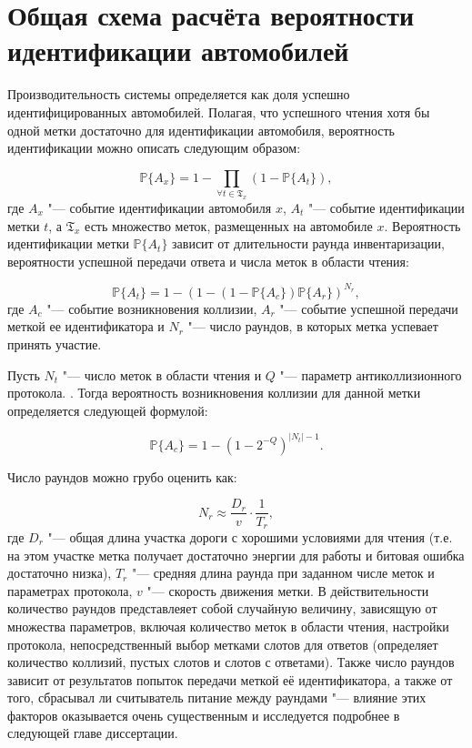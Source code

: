 \section{Общая схема расчёта вероятности идентификации автомобилей}\label{sec:ch2_general_scheme}
Производительность системы определяется как доля успешно идентифицированных автомобилей. Полагая, что успешного чтения хотя бы одной метки достаточно для идентификации автомобиля, вероятность идентификации можно описать следующим образом:

$$
	\mathbb{P}\{A_x\} = 1 - \prod\limits_{\forall t \in  \mathfrak{T}_x} (1 - \mathbb{P}\{A_t\}),
$$
где $A_x$ "--- событие идентификации автомобиля $x$, $A_t$ "--- событие идентификации метки $t$, а $\mathfrak{T}_x$ есть множество меток, размещенных на автомобиле $x$. Вероятность идентификации метки $\mathbb{P}\{A_t\}$ зависит от длительности раунда инвентаризации, вероятности успешной передачи ответа и числа меток в области чтения:

$$
	\mathbb{P}\{A_t\} = 1 - (1 - (1 - \mathbb{P}\{A_c\})\mathbb{P}\{A_r\})^{N_r},
$$
где $A_c$ "--- событие возникновения коллизии, $A_r$ "--- событие успешной передачи меткой ее идентификатора и $N_r$ "--- число раундов, в которых метка успевает принять участие. 

Пусть $N_t$ "--- число меток в области чтения и $Q$ "--- параметр антиколлизионного протокола. \cite{StdGen2}. Тогда вероятность возникновения коллизии для данной метки определяется следующей формулой: 

$$
	\mathbb{P}\{A_c\} = 1 - (1 - 2^{-Q})^{|N_t| - 1}.
$$

Число раундов можно грубо оценить как:

$$
	N_r \approx \frac{D_r}{v}\cdot\frac{1}{T_r},
$$
где $D_r$ "--- общая длина участка дороги с хорошими условиями для чтения (т.е. на этом участке метка получает достаточно энергии для работы и битовая ошибка достаточно низка), $T_r$ "--- средняя длина раунда при заданном числе меток и параметрах протокола, $v$ "--- скорость движения метки. В действительности количество раундов представлеяет собой случайную величину, зависящую от множества параметров, включая количество меток в области чтения, настройки протокола, непосредственный выбор метками слотов для ответов (определяет количество коллизий, пустых слотов и слотов с ответами). Также число раундов зависит от результатов попыток передачи меткой её идентификатора, а также от того, сбрасывал ли считыватель питание между раундами "--- влияние этих факторов оказывается очень существенным и исследуется подробнее в следующей главе диссертации. 

